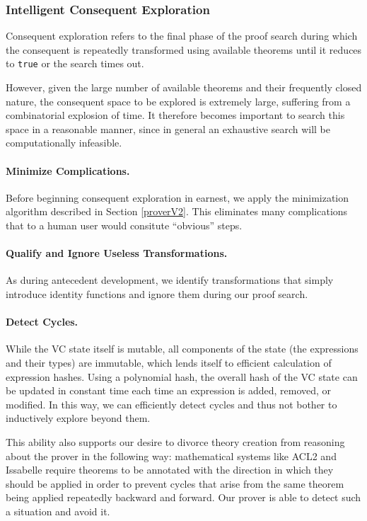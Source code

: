 		\subsubsection{Intelligent Consequent Exploration\label{consequentExploration}}

Consequent exploration refers to the final phase of the proof search during which the consequent is repeatedly transformed using available theorems until it reduces to \texttt{true} or the search times out.

However, given the large number of available theorems and their frequently closed nature, the consequent space to be explored is extremely large, suffering from a combinatorial explosion of time.  It therefore becomes important to search this space in a reasonable manner, since in general an exhaustive search will be computationally infeasible.

\paragraph{Minimize Complications.}  Before beginning consequent exploration in earnest, we apply the minimization algorithm described in Section \ref{proverV2}.  This eliminates many complications that to a human user would consitute ``obvious'' steps.

\paragraph{Qualify and Ignore Useless Transformations.}  As during antecedent development, we identify transformations that simply introduce identity functions and ignore them during our proof search.

\paragraph{Detect Cycles.}  While the VC state itself is mutable, all components of the state (the expressions and their types) are immutable, which lends itself to efficient calculation of expression hashes.  Using a polynomial hash, the overall hash of the VC state can be updated in constant time each time an expression is added, removed, or modified.  In this way, we can efficiently detect cycles and thus not bother to inductively explore beyond them.

This ability also supports our desire to divorce theory creation from reasoning about the prover in the following way: mathematical systems like ACL2\cite{ACL2} and Issabelle\cite{Issabelle} require theorems to be annotated with the direction in which they should be applied in order to prevent cycles that arise from the same theorem being applied repeatedly backward and forward.  Our prover is able to detect such a situation and avoid it.

